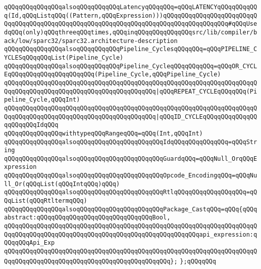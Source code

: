 \newline
\verb|qQQqqQQqqQQqqQQqalsoqQQqqQQqqQQqLatencyqQQqqQQq=qQQqLATENCYqQQqqQQqqQQq(Id,qQQqListqQQq((Pattern,qQQqExpression)))qQQqqQQqqQQqqQQqqQQqqQQqqQQqqQQqqQQqqQQqqQQqqQQqqQQqqQQqqQQqqQQqqQQqqQQqqQQqqQQqqQQqqQQq#qQQqUsedqQQq(only)qQQqthreeqQQqtimes,qQQqinqQQqqQQqqQQqqQQqsrc/lib/compiler/back/low/sparc32/sparc32.architecture-description|\newline
\newline
\verb|qQQqqQQqqQQqqQQqalsoqQQqqQQqqQQqPipeline_CyclesqQQqqQQq=qQQqPIPELINE_CYCLESqQQqqQQqList(Pipeline_Cycle)|\newline
\newline
\verb|qQQqqQQqqQQqqQQqalsoqQQqqQQqqQQqPipeline_CycleqQQqqQQqqQQq=qQQqOR_CYCLEqQQqqQQqqQQqqQQqqQQqqQQq(Pipeline_Cycle,qQQqPipeline_Cycle)|\newline
\verb|qQQqqQQqqQQqqQQqqQQqqQQqqQQqqQQqqQQqqQQqqQQqqQQqqQQqqQQqqQQqqQQqqQQqqQQqqQQqqQQqqQQqqQQqqQQqqQQqqQQqqQQqqQQqqQQq|\verb#|qQQqREPEAT_CYCLEqQQqqQQq(Pipeline_Cycle,qQQqInt)#\newline
\verb|qQQqqQQqqQQqqQQqqQQqqQQqqQQqqQQqqQQqqQQqqQQqqQQqqQQqqQQqqQQqqQQqqQQqqQQqqQQqqQQqqQQqqQQqqQQqqQQqqQQqqQQqqQQqqQQq|\verb#|qQQqID_CYCLEqQQqqQQqqQQqqQQqqQQqqQQqIdqQQq#\newline
\newline
\newline
\verb|qQQqqQQqqQQqqQQqwithtypeqQQqRangeqQQq=qQQq(Int,qQQqInt)|\newline
\verb|qQQqqQQqqQQqqQQqalsoqQQqqQQqqQQqqQQqqQQqqQQqIdqQQqqQQqqQQqqQQq=qQQqString|\newline
\verb|qQQqqQQqqQQqqQQqalsoqQQqqQQqqQQqqQQqqQQqqQQqGuardqQQq=qQQqNull_OrqQQqExpression|\newline
\verb|qQQqqQQqqQQqqQQqalsoqQQqqQQqqQQqqQQqqQQqqQQqOpcode_EncodingqQQq=qQQqNull_Or(qQQqList(qQQqIntqQQq)qQQq)|\newline
\verb|qQQqqQQqqQQqqQQqalsoqQQqqQQqqQQqqQQqqQQqqQQqRtlqQQqqQQqqQQqqQQqqQQq=qQQqList(qQQqRtltermqQQq)|\newline
\verb|qQQqqQQqqQQqqQQqalsoqQQqqQQqqQQqqQQqqQQqqQQqPackage_CastqQQq=qQQq{qQQqabstract:qQQqqQQqqQQqqQQqqQQqqQQqqQQqqQQqBool,|\newline
\verb|qQQqqQQqqQQqqQQqqQQqqQQqqQQqqQQqqQQqqQQqqQQqqQQqqQQqqQQqqQQqqQQqqQQqqQQqqQQqqQQqqQQqqQQqqQQqqQQqqQQqqQQqqQQqqQQqqQQqqQQqqQQqapi_expression:qQQqqQQqApi_Exp|\newline
\verb|qQQqqQQqqQQqqQQqqQQqqQQqqQQqqQQqqQQqqQQqqQQqqQQqqQQqqQQqqQQqqQQqqQQqqQQqqQQqqQQqqQQqqQQqqQQqqQQqqQQqqQQqqQQqqQQqqQQq};|\newline
\newline
\verb|};qQQqqQQq|\newline

